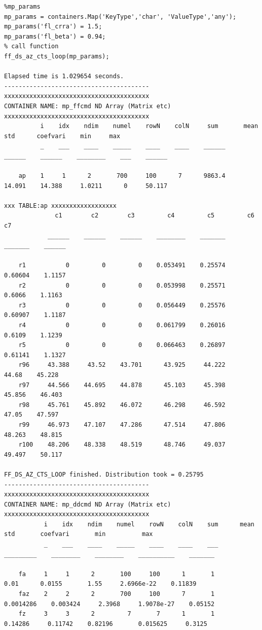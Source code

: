 \documentclass[
]{book}
\begin{document}
\begin{verbatim}
%mp_params
mp_params = containers.Map('KeyType','char', 'ValueType','any');
mp_params('fl_crra') = 1.5;
mp_params('fl_beta') = 0.94;
% call function
ff_ds_az_cts_loop(mp_params);

Elapsed time is 1.029654 seconds.
----------------------------------------
xxxxxxxxxxxxxxxxxxxxxxxxxxxxxxxxxxxxxxxx
CONTAINER NAME: mp_ffcmd ND Array (Matrix etc)
xxxxxxxxxxxxxxxxxxxxxxxxxxxxxxxxxxxxxxxx
          i    idx    ndim    numel    rowN    colN     sum       mean      std      coefvari    min     max  
          _    ___    ____    _____    ____    ____    ______    ______    ______    ________    ___    ______

    ap    1     1      2       700     100      7      9863.4    14.091    14.388     1.0211      0     50.117

xxx TABLE:ap xxxxxxxxxxxxxxxxxx
              c1        c2        c3         c4         c5         c6         c7  
            ______    ______    ______    ________    _______    _______    ______

    r1           0         0         0    0.053491    0.25574    0.60604    1.1157
    r2           0         0         0    0.053998    0.25571     0.6066    1.1163
    r3           0         0         0    0.056449    0.25576    0.60907    1.1187
    r4           0         0         0    0.061799    0.26016     0.6109    1.1239
    r5           0         0         0    0.066463    0.26897    0.61141    1.1327
    r96     43.388     43.52    43.701      43.925     44.222      44.68    45.228
    r97     44.566    44.695    44.878      45.103     45.398     45.856    46.403
    r98     45.761    45.892    46.072      46.298     46.592      47.05    47.597
    r99     46.973    47.107    47.286      47.514     47.806     48.263    48.815
    r100    48.206    48.338    48.519      48.746     49.037     49.497    50.117

FF_DS_AZ_CTS_LOOP finished. Distribution took = 0.25795
----------------------------------------
xxxxxxxxxxxxxxxxxxxxxxxxxxxxxxxxxxxxxxxx
CONTAINER NAME: mp_ddcmd ND Array (Matrix etc)
xxxxxxxxxxxxxxxxxxxxxxxxxxxxxxxxxxxxxxxx
           i    idx    ndim    numel    rowN    colN    sum      mean         std       coefvari       min          max  
           _    ___    ____    _____    ____    ____    ___    _________    ________    ________    __________    _______

    fa     1     1      2       100     100      1       1          0.01      0.0155       1.55     2.6966e-22    0.11839
    faz    2     2      2       700     100      7       1     0.0014286    0.003424     2.3968     1.9078e-27    0.05152
    fz     3     3      2         7       7      1       1       0.14286     0.11742    0.82196       0.015625     0.3125


\end{verbatim}
\end{document}
